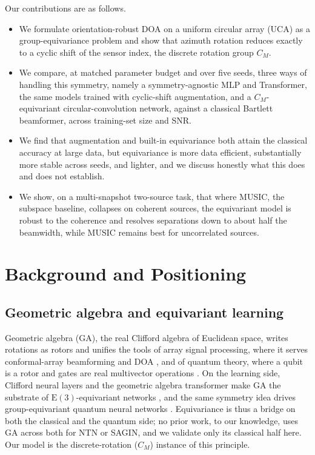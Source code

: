 \documentclass[conference]{IEEEtran}
\begin{document}
Our contributions are as follows.
\begin{itemize}
\item We formulate orientation-robust DOA on a uniform circular array (UCA) as a
group-equivariance problem and show that azimuth rotation reduces exactly to a
cyclic shift of the sensor index, the discrete rotation group $C_M$.
\item We compare, at matched parameter budget and over five seeds, three ways of
handling this symmetry, namely a symmetry-agnostic MLP and Transformer, the same
models trained with cyclic-shift augmentation, and a $C_M$-equivariant
circular-convolution network, against a classical Bartlett beamformer, across
training-set size and SNR.
\item We find that augmentation and built-in equivariance both attain the classical
accuracy at large data, but equivariance is more data efficient, substantially more
stable across seeds, and lighter, and we discuss honestly what this does and does
not establish.
\item We show, on a multi-snapshot two-source task, that where MUSIC, the subspace
baseline, collapses on coherent sources, the equivariant model is robust to the
coherence and resolves separations down to about half the beamwidth, while MUSIC
remains best for uncorrelated sources.
\end{itemize}

\section{Background and Positioning}
\subsection{Geometric algebra and equivariant learning}
Geometric algebra (GA), the real Clifford algebra of Euclidean space, writes
rotations as rotors and unifies the tools of array signal processing, where it
serves conformal-array beamforming and DOA \cite{zou2011,meng2017,wang2021}, and of
quantum theory, where a qubit is a rotor and gates are real multivector operations
\cite{haveldoran2000,doran1996,cafaro2011,cafaro2024}. On the learning side,
Clifford neural layers and the geometric algebra transformer make GA the substrate
of $\mathrm{E}(3)$-equivariant networks \cite{clifford2022,cliffordlayers,gatr2023},
and the same symmetry idea drives group-equivariant quantum neural networks
\cite{larocca2022,nguyen2024}. Equivariance is thus a bridge on both the classical
and the quantum side; no prior work, to our knowledge, uses GA across both for NTN
or SAGIN, and we validate only its classical half here. Our model is the
discrete-rotation ($C_M$) instance of this principle.
\end{document}
